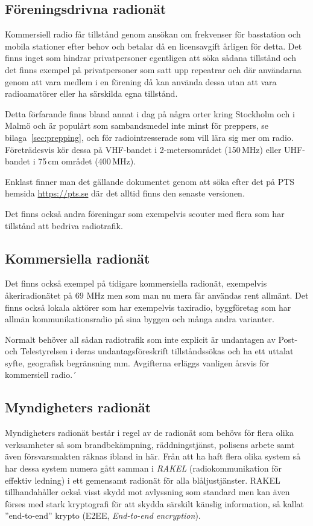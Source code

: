 \subsection{Föreningsdrivna radionät}

Kommersiell radio får tillstånd genom ansökan om frekvenser för basstation och
mobila stationer efter behov och betalar då en licensavgift årligen för
detta. Det finns inget som hindrar privatpersoner egentligen att söka sådana
tillstånd och det finns exempel på privatpersoner som satt upp repeatrar och där
användarna genom att vara medlem i en förening då kan använda dessa utan att
vara radioamatörer eller ha särskilda egna tillstånd.

Detta förfarande finns bland annat i dag på några orter kring Stockholm och i
Malmö och är populärt som sambandsmedel inte minst för preppers, se
bilaga~\ref{sec:prepping}, och för radiointresserade som vill lära sig mer
om radio. Företrädesvis kör dessa på
VHF-bandet i 2-metersområdet (150\,MHz) eller UHF-bandet i 75\,cm området
(400\,MHz).

Enklast finner man det gällande dokumentet genom att söka efter det på PTS
hemsida \url{https://pts.se} där det alltid finns den senaste versionen.

Det finns också andra föreningar som exempelvis scouter med flera som har
tillstånd att bedriva radiotrafik.

\subsection{Kommersiella radionät}

Det finns också exempel på tidigare kommersiella radionät, exempelvis
åkeriradionätet på 69 MHz men som man nu mera får användas rent allmänt.
Det finns också lokala aktörer som har exempelvis taxiradio, byggföretag
som har allmän kommunikationsradio på sina byggen och många andra
varianter.

Normalt behöver all sådan radiotrafik som inte explicit är undantagen av
Post- och Telestyrelsen i deras undantagsföreskrift tillståndssökas och
ha ett uttalat syfte, geografisk begränsning mm. Avgifterna erläggs vanligen
årsvis för kommersiell radio.´

\subsection{Myndigheters radionät}

Myndigheters radionät består i regel av de radionät som behövs för flera olika
verksamheter så som brandbekämpning, räddningstjänst, polisens arbete samt
även försvarsmakten räknas ibland in här. Från att ha haft flera olika system
så har dessa system numera gått samman i {\it RAKEL} (radiokommunikation för
effektiv ledning) i ett gemensamt radionät för alla blåljustjänster. RAKEL
tillhandahåller också visst skydd mot avlyssning som standard men kan även
förses med stark kryptografi för att skydda särskilt känslig information, så
kallat ''end-to-end'' krypto (E2EE, {\it End-to-end encryption}).

